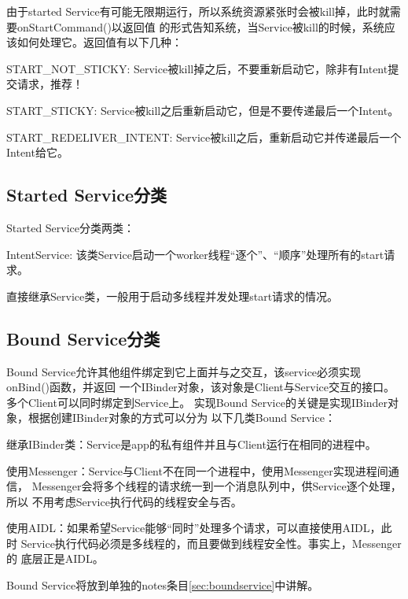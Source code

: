 ﻿\documentclass[a4paper,11pt]{article}
\begin{document}
  由于started Service有可能无限期运行，所以系统资源紧张时会被kill掉，此时就需要onStartCommand()以返回值
  的形式告知系统，当Service被kill的时候，系统应该如何处理它。返回值有以下几种：\par
  \begin{coloredenumerate}
    \item START\_NOT\_STICKY: Service被kill掉之后，不要重新启动它，除非有Intent提交请求，推荐！
    \item START\_STICKY: Service被kill之后重新启动它，但是不要传递最后一个Intent。
    \item START\_REDELIVER\_INTENT: Service被kill之后，重新启动它并传递最后一个Intent给它。
  \end{coloredenumerate}

  \subsection[Started Service分类]{Started Service分类}
  Started Service分类两类：\par
  \begin{coloredenumerate}
    \item IntentService: 该类Service启动一个worker线程“逐个”、“顺序”处理所有的start请求。
    \item 直接继承Service类，一般用于启动多线程并发处理start请求的情况。
  \end{coloredenumerate}

  \subsection[Bound Service分类]{Bound Service分类}
  Bound Service允许其他组件绑定到它上面并与之交互，该service必须实现onBind()函数，并返回
  一个IBinder对象，该对象是Client与Service交互的接口。多个Client可以同时绑定到Service上。
  实现Bound Service的关键是实现IBinder对象，根据创建IBinder对象的方式可以分为
  以下几类Bound Service：\par
  \begin{coloredenumerate}
    \item 继承IBinder类：Service是app的私有组件并且与Client运行在相同的进程中。
    \item 使用Messenger：Service与Client不在同一个进程中，使用Messenger实现进程间通信，
          Messenger会将多个线程的请求统一到一个消息队列中，供Service逐个处理，所以
          不用考虑Service执行代码的线程安全与否。
    \item 使用AIDL：如果希望Service能够“同时”处理多个请求，可以直接使用AIDL，此时
          Service执行代码必须是多线程的，而且要做到线程安全性。事实上，Messenger的
          底层正是AIDL。
  \end{coloredenumerate}
  Bound Service将放到单独的notes条目\ref{sec:boundservice}中讲解。
\end{document}
